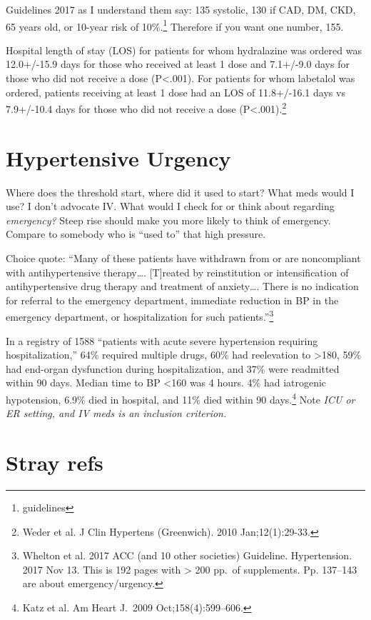 \documentclass{tufte-handout}
\begin{document}
Guidelines 2017 as I understand them say: 135 systolic, 130 if CAD, DM, CKD, 65 years old, or 10-year risk of 10\%.\footnote{guidelines} Therefore if you want one number, 155.

Hospital length of stay (LOS) for patients for whom hydralazine was ordered was 12.0+/-15.9 days for those who received at least 1 dose and 7.1+/-9.0 days for those who did not receive a dose (P<.001). For patients for whom labetalol was ordered, patients receiving at least 1 dose had an LOS of 11.8+/-16.1 days vs 7.9+/-10.4 days for those who did not receive a dose (P<.001).\footnote{Weder et al. J Clin Hypertens (Greenwich). 2010 Jan;12(1):29-33. }
 

\section{Hypertensive Urgency}

Where does the threshold start, where did it used to start?
What meds would I use? I
don't advocate IV. What would I check for or think about regarding
\emph{emergency?} Steep rise should make you more likely to think of
emergency. Compare to somebody who is ``used to'' that high pressure.

Choice quote: ``Many of these
patients have withdrawn from or are noncompliant with antihypertensive therapy\ldots{}.
[T]reated by reinstitution or intensification of antihypertensive drug
therapy and treatment of anxiety\ldots{}. There is no indication for referral to the emergency
department, immediate reduction in BP in the emergency department, or hospitalization for such
patients.''\footnote{Whelton et al. 2017 ACC (and 10 other societies) Guideline. Hypertension. 2017 Nov 13. This is 192 pages with > 200 pp.\ of supplements. Pp. 137--143 are about emergency/urgency.}

In a registry of 1588 ``patients with acute severe hypertension requiring hospitalization,'' 64\% required multiple drugs, 60\% had reelevation to >180, 59\% had end-organ dysfunction during hospitalization, and 37\% were readmitted within 90 days. Median time to BP <160 was 4 hours. 4\% had iatrogenic hypotension, 6.9\% died in hospital, and 11\% died within 90 days.\footnote{Katz et al. Am Heart J.\ 2009 Oct;158(4):599--606.} Note \emph{ICU or ER setting, and IV meds is an inclusion criterion.}


\section{Stray refs}
\end{document}
